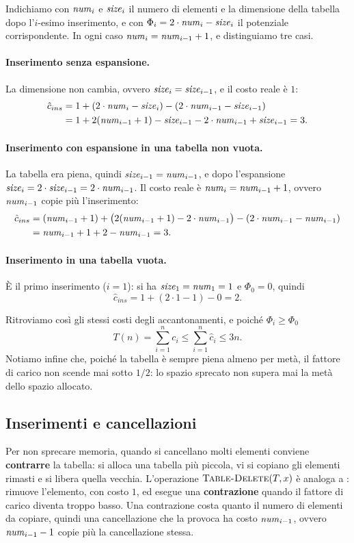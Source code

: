 Indichiamo con $\mathit{num}_i$ e $\mathit{size}_i$ il numero di elementi e la dimensione della tabella dopo l'$i$-esimo inserimento, e con $\Phi_i = 2\cdot\mathit{num}_i - \mathit{size}_i$ il potenziale corrispondente. In ogni caso $\mathit{num}_i = \mathit{num}_{i-1} + 1$, e distinguiamo tre casi.

\paragraph{Inserimento senza espansione.}
La dimensione non cambia, ovvero $\mathit{size}_i = \mathit{size}_{i-1}$, e il costo reale è $1$:
\[
\begin{aligned}
\hat{c}_{ins} &= 1 + (2\cdot\mathit{num}_i - \mathit{size}_i) - (2\cdot\mathit{num}_{i-1} - \mathit{size}_{i-1}) \\
&= 1 + 2(\mathit{num}_{i-1} + 1) - \mathit{size}_{i-1} - 2\cdot\mathit{num}_{i-1} + \mathit{size}_{i-1} = 3.
\end{aligned}
\]

\paragraph{Inserimento con espansione in una tabella non vuota.}
La tabella era piena, quindi $\mathit{size}_{i-1} = \mathit{num}_{i-1}$, e dopo l'espansione $\mathit{size}_i = 2\cdot\mathit{size}_{i-1} = 2\cdot\mathit{num}_{i-1}$. Il costo reale è $\mathit{num}_i = \mathit{num}_{i-1} + 1$, ovvero $\mathit{num}_{i-1}$ copie più l'inserimento:
\[
\begin{aligned}
\hat{c}_{ins} &= (\mathit{num}_{i-1} + 1) + \bigl(2(\mathit{num}_{i-1} + 1) - 2\cdot\mathit{num}_{i-1}\bigr) - (2\cdot\mathit{num}_{i-1} - \mathit{num}_{i-1}) \\
&= \mathit{num}_{i-1} + 1 + 2 - \mathit{num}_{i-1} = 3.
\end{aligned}
\]

\paragraph{Inserimento in una tabella vuota.}
È il primo inserimento ($i = 1$): si ha $\mathit{size}_1 = \mathit{num}_1 = 1$ e $\Phi_0 = 0$, quindi
\[
\hat{c}_{ins} = 1 + (2\cdot 1 - 1) - 0 = 2.
\]

Ritroviamo così gli stessi costi degli accantonamenti, e poiché $\Phi_i \ge \Phi_0$
\[
T(n) = \sum_{i=1}^{n} c_i \le \sum_{i=1}^{n} \hat{c}_i \le 3n.
\]
Notiamo infine che, poiché la tabella è sempre piena almeno per metà, il fattore di carico non scende mai sotto $1/2$: lo spazio sprecato non supera mai la metà dello spazio allocato.

\subsection{Inserimenti e cancellazioni}
Per non sprecare memoria, quando si cancellano molti elementi conviene \textbf{contrarre} la tabella: si alloca una tabella più piccola, vi si copiano gli elementi rimasti e si libera quella vecchia. L'operazione $\textsc{Table-Delete}(T,x)$ è analoga a \TableInsert: rimuove l'elemento, con costo $1$, ed esegue una \textbf{contrazione} quando il fattore di carico diventa troppo basso. Una contrazione costa quanto il numero di elementi da copiare, quindi una cancellazione che la provoca ha costo $\mathit{num}_{i-1}$, ovvero $\mathit{num}_{i-1} - 1$ copie più la cancellazione stessa.

